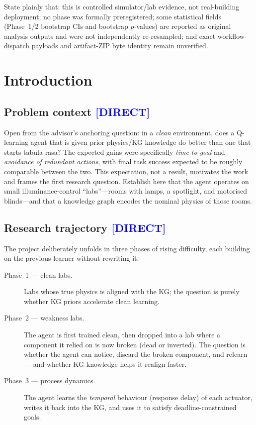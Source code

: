 \documentclass[12pt, a4paper, oneside]{memoir}
\newcommand{\evDirect}{\textcolor{blue}{[DIRECT]}}
\begin{document}
State plainly that:
this is controlled simulator/lab evidence, not real-building deployment;
no phase was formally preregistered;
some statistical fields (Phase~1/2 bootstrap CIs and bootstrap $p$-values)
are reported as original analysis outputs and were not independently
re-resampled; and
exact workflow-dispatch payloads and artifact-ZIP byte identity remain
unverified.

\chapter{Introduction}
\label{ch:introduction}

\section{Problem context \evDirect}
\label{sec:intro-problem}

Open from the advisor's anchoring question: in a \emph{clean} environment,
does a Q-learning agent that is given prior physics/KG knowledge do better
than one that starts tabula rasa?  The expected gains were specifically
\emph{time-to-goal} and \emph{avoidance of redundant actions}, with final
task success expected to be roughly comparable between the two.  This
expectation, not a result, motivates the work and frames the first research
question.  Establish here that the agent operates on small
illuminance-control \enquote{labs}---rooms with lamps, a spotlight, and
motorised blinds---and that a knowledge graph encodes the nominal physics of
those rooms.

\section{Research trajectory \evDirect}
\label{sec:intro-trajectory}

The project deliberately unfolds in three phases of rising difficulty, each
building on the previous learner without rewriting it.

\begin{description}
  \item[Phase~1 --- clean labs.]
    Labs whose true physics is aligned with the KG\@; the question is purely
    whether KG priors accelerate clean learning.

  \item[Phase~2 --- weakness labs.]
    The agent is first trained clean, then dropped into a lab where a
    component it relied on is now broken (dead or inverted).  The question is
    whether the agent can notice, discard the broken component, and relearn
    --- and whether KG knowledge helps it realign faster.

  \item[Phase~3 --- process dynamics.]
    The agent learns the \emph{temporal} behaviour (response delay) of each
    actuator, writes it back into the KG, and uses it to satisfy
    deadline-constrained goals.
\end{description}
\end{document}
